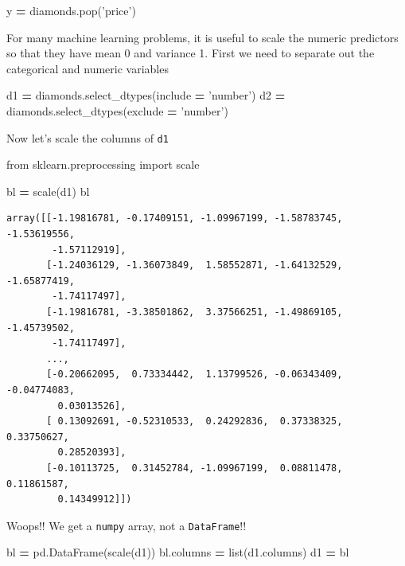 \documentclass[
  letterpaper,
]{scrbook}
\newenvironment{Shaded}{\begin{snugshade}}{\end{snugshade}}
\newcommand{\BuiltInTok}[1]{#1}
\newcommand{\ImportTok}[1]{#1}
\newcommand{\NormalTok}[1]{#1}
\newcommand{\OperatorTok}[1]{\textcolor[rgb]{0.81,0.36,0.00}{\textbf{#1}}}
\newcommand{\StringTok}[1]{\textcolor[rgb]{0.31,0.60,0.02}{#1}}
\begin{document}
\begin{Shaded}
\begin{Highlighting}[]
\NormalTok{y }\OperatorTok{=}\NormalTok{ diamonds.pop(}\StringTok{'price'}\NormalTok{)}
\end{Highlighting}
\end{Shaded}

For many machine learning problems, it is useful to scale the numeric predictors so that they have mean 0 and
variance 1. First we need to separate out the categorical and numeric variables

\begin{Shaded}
\begin{Highlighting}[]
\NormalTok{d1 }\OperatorTok{=}\NormalTok{ diamonds.select_dtypes(include }\OperatorTok{=} \StringTok{'number'}\NormalTok{)}
\NormalTok{d2 }\OperatorTok{=}\NormalTok{ diamonds.select_dtypes(exclude }\OperatorTok{=} \StringTok{'number'}\NormalTok{)}
\end{Highlighting}
\end{Shaded}

Now let's scale the columns of \texttt{d1}

\begin{Shaded}
\begin{Highlighting}[]
\ImportTok{from}\NormalTok{ sklearn.preprocessing }\ImportTok{import}\NormalTok{ scale}

\NormalTok{bl }\OperatorTok{=}\NormalTok{ scale(d1)}
\NormalTok{bl}
\end{Highlighting}
\end{Shaded}

\begin{verbatim}
array([[-1.19816781, -0.17409151, -1.09967199, -1.58783745, -1.53619556,
        -1.57112919],
       [-1.24036129, -1.36073849,  1.58552871, -1.64132529, -1.65877419,
        -1.74117497],
       [-1.19816781, -3.38501862,  3.37566251, -1.49869105, -1.45739502,
        -1.74117497],
       ...,
       [-0.20662095,  0.73334442,  1.13799526, -0.06343409, -0.04774083,
         0.03013526],
       [ 0.13092691, -0.52310533,  0.24292836,  0.37338325,  0.33750627,
         0.28520393],
       [-0.10113725,  0.31452784, -1.09967199,  0.08811478,  0.11861587,
         0.14349912]])
\end{verbatim}

Woops!! We get a \texttt{numpy} array, not a \texttt{DataFrame}!!

\begin{Shaded}
\begin{Highlighting}[]
\NormalTok{bl }\OperatorTok{=}\NormalTok{ pd.DataFrame(scale(d1))}
\NormalTok{bl.columns }\OperatorTok{=} \BuiltInTok{list}\NormalTok{(d1.columns)}
\NormalTok{d1 }\OperatorTok{=}\NormalTok{ bl}
\end{Highlighting}
\end{Shaded}
\end{document}
